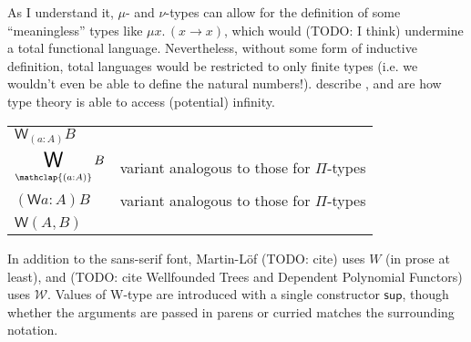 \documentclass[11pt]{article} %
\theoremstyle{definition}
\theoremstyle{remark}
\begin{document}
As I understand it, $\mu$- and $\nu$-types can allow for the definition of some ``meaningless'' types like $\mu x.\,(x \to x)$, which would (TODO: I think) undermine a total functional language.
Nevertheless, without some form of inductive definition, total languages would be restricted to only finite types (i.e. we wouldn't even be able to define the natural numbers!).
 describe , and are how type theory is able to access (potential) infinity.
\begin{center}
\renewcommand{\arraystretch}{1.2}
\begin{tabular}{lp{10cm}}
$\mathsf W_{(a:A)}B$ & \cite{hottbook} \\
$\displaystyle \mathop{\vphantom{\prod}\textsf{\raisebox{-0.5ex}{\LARGE W}}}_{\mathclap{(a:A)}}B$ & variant analogous to those for $\Pi$-types \\
$(\mathsf W a:A)B$ & variant analogous to those for $\Pi$-types \cite{awodey-etal_2012} \\
$\mathsf W(A,B)$ & \cite{petersson-synek_1989} \\
\end{tabular}
\end{center}
In addition to the sans-serif font, Martin-L\"of (TODO: cite) uses $W$ (in prose at least), and (TODO: cite Wellfounded Trees and Dependent Polynomial Functors) uses $\mathcal W$.
Values of W-type are introduced with a single constructor $\mathsf{sup}$, though whether the arguments are passed in parens or curried matches the surrounding notation.
\end{document}
